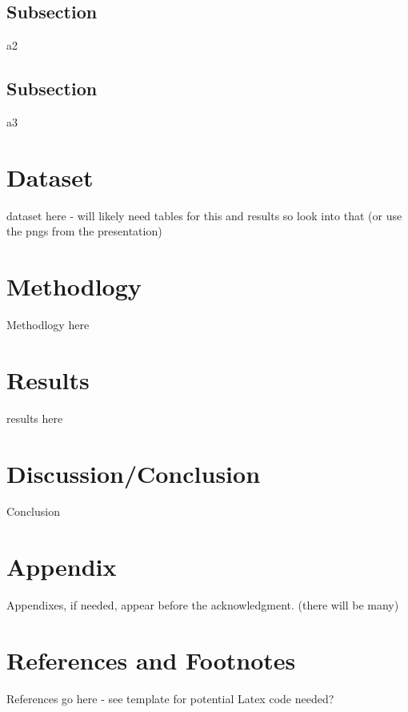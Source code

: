 \documentclass[journal]{IEEEtai}
\begin{document}
\subsection{Subsection}
a2
\subsection{Subsection}
a3
\section{Dataset}
dataset here - will likely need tables for this and results so look into that (or use the pngs from the presentation)

\section{Methodlogy}
Methodlogy here

\section{Results}
results here

\section{Discussion/Conclusion}
Conclusion

\section*{Appendix}

Appendixes, if needed, appear before the acknowledgment. (there will be many)

\section*{References and Footnotes}

References go here - see template for potential Latex code needed?
\end{document}
